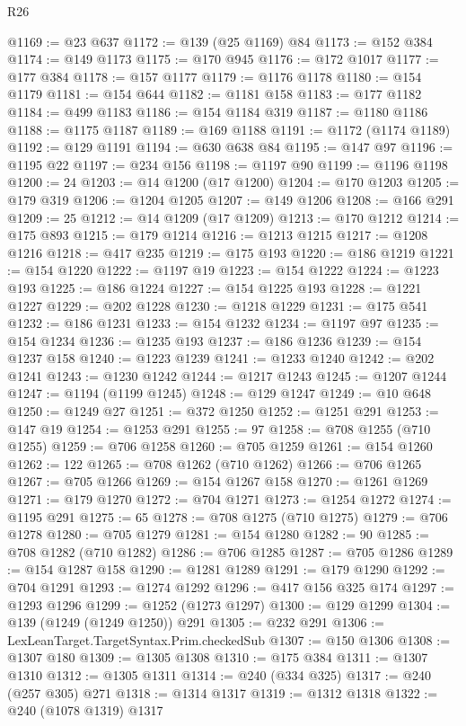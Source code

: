 \begin{lexlean}{R26}
\begin{coremodule}
@1169 := @23 @637
@1172 := @139 (@25 @1169) @84
@1173 := @152 @384
@1174 := @149 @1173
@1175 := @170 @945
@1176 := @172 @1017
@1177 := @177 @384
@1178 := @157 @1177
@1179 := @1176 @1178
@1180 := @154 @1179
@1181 := @154 @644
@1182 := @1181 @158
@1183 := @177 @1182
@1184 := @499 @1183
@1186 := @154 @1184 @319
@1187 := @1180 @1186
@1188 := @1175 @1187
@1189 := @169 @1188
@1191 := @1172 (@1174 @1189)
@1192 := @129 @1191
@1194 := @630 @638 @84
@1195 := @147 @97
@1196 := @1195 @22
@1197 := @234 @156
@1198 := @1197 @90
@1199 := @1196 @1198
@1200 := 24
@1203 := @14 @1200 (@17 @1200)
@1204 := @170 @1203
@1205 := @179 @319
@1206 := @1204 @1205
@1207 := @149 @1206
@1208 := @166 @291
@1209 := 25
@1212 := @14 @1209 (@17 @1209)
@1213 := @170 @1212
@1214 := @175 @893
@1215 := @179 @1214
@1216 := @1213 @1215
@1217 := @1208 @1216
@1218 := @417 @235
@1219 := @175 @193
@1220 := @186 @1219
@1221 := @154 @1220
@1222 := @1197 @19
@1223 := @154 @1222
@1224 := @1223 @193
@1225 := @186 @1224
@1227 := @154 @1225 @193
@1228 := @1221 @1227
@1229 := @202 @1228
@1230 := @1218 @1229
@1231 := @175 @541
@1232 := @186 @1231
@1233 := @154 @1232
@1234 := @1197 @97
@1235 := @154 @1234
@1236 := @1235 @193
@1237 := @186 @1236
@1239 := @154 @1237 @158
@1240 := @1223 @1239
@1241 := @1233 @1240
@1242 := @202 @1241
@1243 := @1230 @1242
@1244 := @1217 @1243
@1245 := @1207 @1244
@1247 := @1194 (@1199 @1245)
@1248 := @129 @1247
@1249 := @10 @648
@1250 := @1249 @27
@1251 := @372 @1250
@1252 := @1251 @291
@1253 := @147 @19
@1254 := @1253 @291
@1255 := 97
@1258 := @708 @1255 (@710 @1255)
@1259 := @706 @1258
@1260 := @705 @1259
@1261 := @154 @1260
@1262 := 122
@1265 := @708 @1262 (@710 @1262)
@1266 := @706 @1265
@1267 := @705 @1266
@1269 := @154 @1267 @158
@1270 := @1261 @1269
@1271 := @179 @1270
@1272 := @704 @1271
@1273 := @1254 @1272
@1274 := @1195 @291
@1275 := 65
@1278 := @708 @1275 (@710 @1275)
@1279 := @706 @1278
@1280 := @705 @1279
@1281 := @154 @1280
@1282 := 90
@1285 := @708 @1282 (@710 @1282)
@1286 := @706 @1285
@1287 := @705 @1286
@1289 := @154 @1287 @158
@1290 := @1281 @1289
@1291 := @179 @1290
@1292 := @704 @1291
@1293 := @1274 @1292
@1296 := @417 @156 @325 @174
@1297 := @1293 @1296
@1299 := @1252 (@1273 @1297)
@1300 := @129 @1299
@1304 := @139 (@1249 (@1249 @1250)) @291
@1305 := @232 @291
@1306 := LexLeanTarget.TargetSyntax.Prim.checkedSub
@1307 := @150 @1306
@1308 := @1307 @180
@1309 := @1305 @1308
@1310 := @175 @384
@1311 := @1307 @1310
@1312 := @1305 @1311
@1314 := @240 (@334 @325)
@1317 := @240 (@257 @305) @271
@1318 := @1314 @1317
@1319 := @1312 @1318
@1322 := @240 (@1078 @1319) @1317

\end{coremodule}
\end{lexlean}
